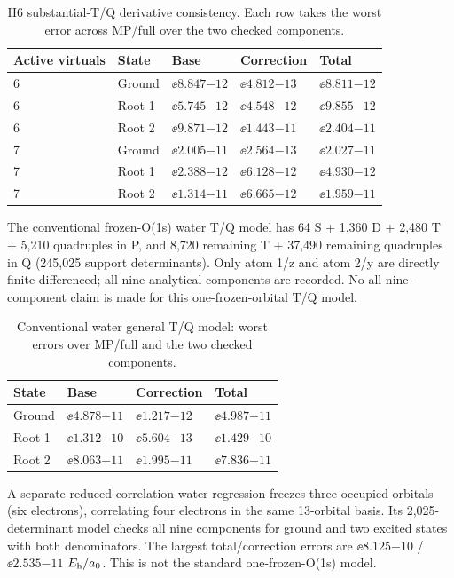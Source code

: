 \begin{table}[htbp]\centering\small
\begin{tabular}{lllll}
\toprule
Active virtuals & State & Base & Correction & Total\\
\midrule
6 & Ground & $\ee{8.847}{-12}$ & $\ee{4.812}{-13}$ & $\ee{8.811}{-12}$\\
6 & Root 1 & $\ee{5.745}{-12}$ & $\ee{4.548}{-12}$ & $\ee{9.855}{-12}$\\
6 & Root 2 & $\ee{9.871}{-12}$ & $\ee{1.443}{-11}$ & $\ee{2.404}{-11}$\\
7 & Ground & $\ee{2.005}{-11}$ & $\ee{2.564}{-13}$ & $\ee{2.027}{-11}$\\
7 & Root 1 & $\ee{2.388}{-12}$ & $\ee{6.128}{-12}$ & $\ee{4.930}{-12}$\\
7 & Root 2 & $\ee{1.314}{-11}$ & $\ee{6.665}{-12}$ & $\ee{1.959}{-11}$\\
\bottomrule
\end{tabular}
\caption{H6 substantial-T/Q derivative consistency. Each row takes the worst error across MP/full over the two checked components.}\label{tab:h6errors}
\end{table}

The conventional frozen-O(1s) water T/Q model has 64 S + 1,360 D +
2,480 T + 5,210 quadruples in P, and 8,720 remaining T + 37,490 remaining
quadruples in Q (245,025 support determinants). Only atom 1/z and atom 2/y
are directly finite-differenced; all nine analytical components are recorded.
No all-nine-component claim is made for this one-frozen-orbital T/Q model.

\begin{table}[htbp]\centering\small
\begin{tabular}{llll}
\toprule
State & Base & Correction & Total\\
\midrule
Ground & $\ee{4.878}{-11}$ & $\ee{1.217}{-12}$ & $\ee{4.987}{-11}$\\
Root 1 & $\ee{1.312}{-10}$ & $\ee{5.604}{-13}$ & $\ee{1.429}{-10}$\\
Root 2 & $\ee{8.063}{-11}$ & $\ee{1.995}{-11}$ & $\ee{7.836}{-11}$\\
\bottomrule
\end{tabular}
\caption{Conventional water general T/Q model: worst errors over MP/full and the two checked components.}\label{tab:watertq}
\end{table}

A separate reduced-correlation water regression freezes three occupied
orbitals (six electrons), correlating four electrons in the same 13-orbital basis.
Its 2,025-determinant model checks all nine components for ground and two excited
states with both denominators. The largest total/correction errors are $\ee{8.125}{-10}$ / $\ee{2.535}{-11}$ $E_{\mathrm h}/a_0$.
This is not the standard one-frozen-O(1s) model.

